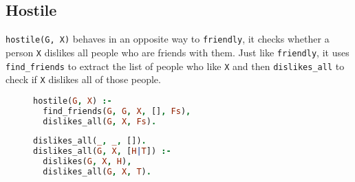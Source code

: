 \documentclass{article}
\begin{document}
\subsection{Hostile}
\texttt{hostile(G, X)} behaves in an opposite way to \texttt{friendly}, it checks whether a person \texttt{X} dislikes all people who are friends with them. Just like \texttt{friendly}, it uses \texttt{find\_friends} to extract the list of people who like \texttt{X} and then \texttt{dislikes\_all} to check if \texttt{X} dislikes all of those people. 
\begin{figure}[h!]
\begin{minipage}{0.5\textwidth}
\begin{lstlisting}[language=Prolog]
hostile(G, X) :-
  find_friends(G, G, X, [], Fs),
  dislikes_all(G, X, Fs).
\end{lstlisting}
\end{minipage}
\begin{minipage}{0.5\textwidth}
\begin{lstlisting}[language=Prolog]
dislikes_all(_, _, []).
dislikes_all(G, X, [H|T]) :-
  dislikes(G, X, H),
  dislikes_all(G, X, T).
\end{lstlisting}
\end{minipage}
\end{figure}
\end{document}
